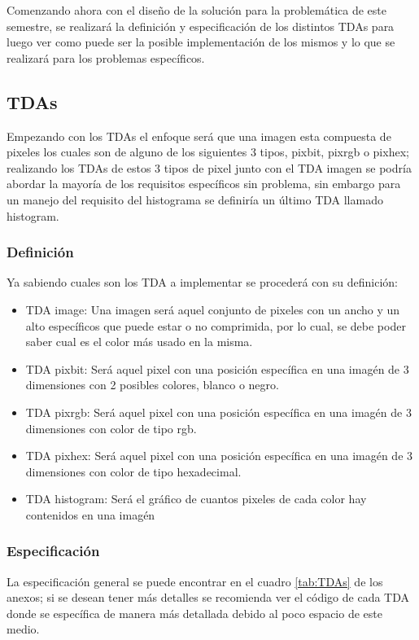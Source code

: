 Comenzando ahora con el diseño de la solución para la problemática de este semestre, se realizará la definición y especificación
de los distintos TDAs para luego ver como puede ser la posible implementación de los mismos y lo que se realizará para los problemas
específicos.

\subsection{TDAs}
 Empezando con los TDAs el enfoque será que una imagen esta compuesta de pixeles los cuales
  son de alguno de los siguientes 3 tipos, pixbit, pixrgb o pixhex; realizando los TDAs de estos 3 tipos
  de pixel junto con el TDA imagen se podría abordar la mayoría de los requisitos específicos sin problema, sin 
  embargo para un manejo del requisito del histograma se definiría un último TDA llamado histogram.\\

  \subsubsection{Definición}
    Ya sabiendo cuales son los TDA a implementar se procederá con su definición:
    \begin{itemize}
      \item TDA image: Una imagen será aquel conjunto de pixeles con un ancho y un alto específicos
        que puede estar o no comprimida, por lo cual, se debe poder saber cual es el color más usado en la misma.
      \item TDA pixbit: Será aquel pixel con una posición específica en una imagén de 3 dimensiones con 2 posibles colores, blanco o negro.
      \item TDA pixrgb: Será aquel pixel con una posición específica en una imagén de 3 dimensiones con color de tipo rgb.
      \item TDA pixhex: Será aquel pixel con una posición específica en una imagén de 3 dimensiones con color de tipo hexadecimal.
      \item TDA histogram: Será el gráfico de cuantos pixeles de cada color hay contenidos en una imagén
    \end{itemize}

  \subsubsection{Especificación}
    La especificación general se puede encontrar en el cuadro \ref{tab:TDAs} de los anexos;
    si se desean tener más detalles se recomienda ver el código de cada TDA donde se específica
    de manera más detallada debido al poco espacio de este medio.

